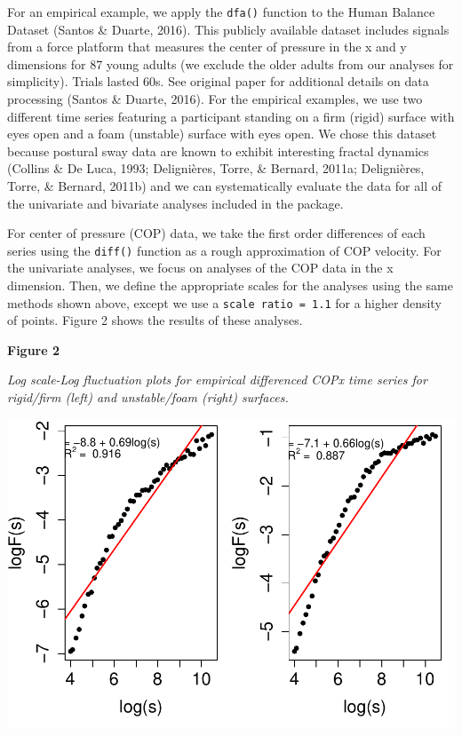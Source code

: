 \documentclass[
  man]{apa6}
\begin{document}
For an empirical example, we apply the \texttt{dfa()} function to the Human
Balance Dataset (Santos \& Duarte, 2016). This publicly available dataset includes
signals from a force platform that measures the center of pressure in
the x and y dimensions for 87 young adults (we exclude the older adults
from our analyses for simplicity). Trials lasted 60s. See original paper
for additional details on data processing (Santos \& Duarte, 2016). For the
empirical examples, we use two different time series featuring a
participant standing on a firm (rigid) surface with eyes open and a foam
(unstable) surface with eyes open. We chose this dataset because
postural sway data are known to exhibit interesting fractal dynamics
(Collins \& De Luca, 1993; Delignières, Torre, \& Bernard, 2011a; Delignières, Torre, \& Bernard, 2011b) and we can
systematically evaluate the data for all of the univariate and bivariate
analyses included in the package.

For center of pressure (COP) data, we take the first order differences
of each series using the \texttt{diff()} function as a rough approximation of
COP velocity. For the univariate analyses, we focus on analyses of the
COP data in the x dimension. Then, we define the appropriate scales for
the analyses using the same methods shown above, except we use a
\texttt{scale\ ratio\ =\ 1.1} for a higher density of points. Figure 2 shows the
results of these analyses.

\textbf{Figure 2}

\emph{Log scale-Log fluctuation plots for empirical differenced COPx time
series for rigid/firm (left) and unstable/foam (right) surfaces.}

\includegraphics{fractal_regression_paper_brm_files/figure-latex/unnamed-chunk-5-1.pdf}
\end{document}
